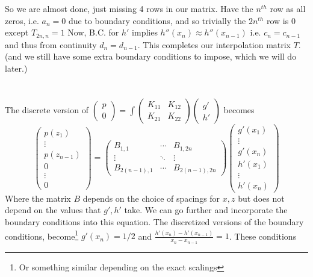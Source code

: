 \documentclass{article}
\begin{document}
So we are almost done, just missing 4 rows in our matrix. Have the
$n^{th}$ row as all zeros, i.e. $a_n=0$ due to boundary conditions,
and so trivially the $2n^{th}$ row is 0 except $T_{2n,n} = 1 $
Now, B.C. for $h'$ implies $h''(x_n) \approx h''(x_{n-1})$ i.e.
$c_n=c_{n-1}$ and thus from continuity $d_n=d_{n-1}$. This completes
our interpolation matrix $T$. (and we still have some extra boundary
conditions to impose, which we will do later.)
\\
\\
\\
The discrete version of 
$\displaystyle \left( \begin{array}{c} p \\ 0 \end{array} \right) =
\int \left(
\begin{array}{cc} K_{11} & K_{12} \\ K_{21} & K_{22} \end{array}
\right)
 \left( \begin{array}{c} g' \\ h' \end{array} \right) $
becomes
\[ \left( \begin{array}{c} p(z_1) \\ \vdots \\ p(z_{n-1}) \\[4pt] 0 \\ \vdots \\
0 \end{array} \right) =
\left( \begin{array}{ccc} B_{1,1} & \cdots & B_{1 , 2n} \\
\vdots & \ddots & \vdots \\ B_{2(n-1),1} & \cdots & B_{2(n-1) , 2n} 
\end{array}
\right)
 \left( \begin{array}{c} g'(x_1) \\ \vdots \\ g'(x_n) \\[4pt] h'(x_1) \\ \vdots
\\ h'(x_n) \end{array} \right) \]
Where the matrix $B$ depends on the choice of spacings for $x, z$ but does
not depend on the values that $g', h'$ take.
We can go further and incorporate the boundary conditions into this equation. 
The discretized versions of the boundary conditions, become\footnote{Or
something similar depending on the exact scalings} 
$g'(x_n)=1/2$ and $\frac{h'(x_n)-h'(x_{n-1})}{x_n-x_{n-1}} = 1$. These conditions
\end{document}
